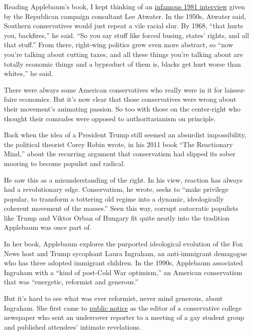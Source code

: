 Reading Applebaum's book, I kept thinking of an
\href{https://www.thenation.com/article/archive/exclusive-lee-atwaters-infamous-1981-interview-southern-strategy/}{infamous
1981 interview} given by the Republican campaign consultant Lee Atwater.
In the 1950s, Atwater said, Southern conservatives would just repeat a
vile racial slur. By 1968, ``that hurts you, backfires,'' he said. ``So
you say stuff like forced busing, states' rights, and all that stuff.''
From there, right-wing politics grew even more abstract, so ``now you're
talking about cutting taxes, and all these things you're talking about
are totally economic things and a byproduct of them is, blacks get hurt
worse than whites,'' he said.

There were always some American conservatives who really were in it for
laissez-faire economics. But it's now clear that those conservatives
were wrong about their movement's animating passion. So too with those
on the center-right who thought their comrades were opposed to
authoritarianism on principle.

Back when the idea of a President Trump still seemed an absurdist
impossibility, the political theorist Corey Robin wrote, in his 2011
book ``The Reactionary Mind,'' about the recurring argument that
conservatism had slipped its sober mooring to become populist and
radical.

He saw this as a misunderstanding of the right. In his view, reaction
has always had a revolutionary edge. Conservatism, he wrote, seeks to
``make privilege popular, to transform a tottering old regime into a
dynamic, ideologically coherent movement of the masses.'' Seen this way,
corrupt autocratic populists like Trump and Viktor Orban of Hungary fit
quite neatly into the tradition Applebaum was once part of.

In her book, Applebaum explores the purported ideological evolution of
the Fox News host and Trump sycophant Laura Ingraham, an anti-immigrant
demagogue who has three adopted immigrant children. In the 1990s,
Applebaum associated Ingraham with a ``kind of post-Cold War optimism,''
an American conservatism that was ``energetic, reformist and generous.''

But it's hard to see what was ever reformist, never mind generous, about
Ingraham. She first came to
\href{https://www.nytimes.com/1984/07/16/us/dartmouth-group-privacy-battle-concord-nh-july-15-ap-student-reporter-s-taping.html}{public
notice} as the editor of a conservative college newspaper who sent an
undercover reporter to a meeting of a gay student group and published
attendees' intimate revelations.

